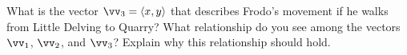 \begin{pa}
\begin{comment}
\solution Using a marked straightedge, the horizontal distance from Hobbiton to Quarry is approximately 19 miles, while the vertical distance is about 7 miles. Since the hobbit traveled east and north, the vector describing their movement is ${\vv_2 = \langle 19.5, 7 \rangle}$. The hobbit walked approximately
\[\sqrt{19^2 + 7^2} \approx 20.25 \text{ miles}.\]

\as

\end{comment}

    \item What is the vector $\vv_3 = \langle x , y \rangle$ that describes Frodo's movement if he walks from Little Delving to Quarry? What relationship do you see among the vectors $\vv_1$, $\vv_2$, and $\vv_3$? Explain why this relationship should hold.

\begin{comment}

\as

\solution Using a marked straightedge, the horizontal distance from Little Delving to Quarry is approximately 27 miles, while the vertical distance is about 3.25 miles. Since the hobbit traveled east and north, the vector describing their movement is ${\vv_3 = \langle 27, 3.25 \rangle}$. The horizontal distance traveled from Little Delving to Quarry is the sum of the distances from Hobbiton to Little Delving and from Hobbiton to Quarry (this is because they traveled in opposite horizontal directions), while the vertical distance from Little Delving to Quarry is the difference of the vertical distance from Hobbiton to Quarry minus the vertical distance from Hobbiton to Little Delving (since they traveled in the vertical direction). So, in essence,
\[\vv_3 - \vv_2 - \vv_1.\]

\as

\end{comment}

    \ea

\end{pa} \afterpa 